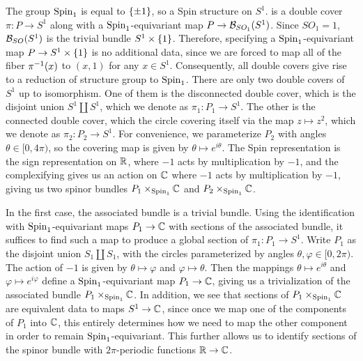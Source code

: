 \begin{exmp}
The group $\mathrm{Spin}_1$ is equal to $\left\lbrace \pm 1 \right\rbrace$, so a Spin structure on $S^1$.
is a double cover $\pi : P \to S^1$ along with a $\mathrm{Spin}_1$-equivariant
map $P \to \mathcal{B}_{SO_1}(S^1)$. Since $SO_1 = 1$, $\mathcal{B}_{SO}(S^1)$ is the trivial
bundle $S^1 \times \left\lbrace 1 \right\rbrace$. Therefore, specifying a $\mathrm{Spin}_1$-equivariant map
$P \to S^1 \times \left\lbrace 1 \right\rbrace$ is no additional data, since we are forced to map
all of the fiber $\pi^{-1}(x)$ to $(x,1)$ for any $x \in S^1$. Consequently,
all double covers give rise to a reduction of structure group to $\mathrm{Spin}_1$.
There are only two double covers of $S^1$ up to isomorphism.
One of them is the disconnected
double cover, which is the disjoint union $S^1 \coprod S^1$, which we denote
as $\pi_1 : P_1 \to S^1$. The other is the connected double cover, which the
circle covering itself via the map $z \mapsto z^2$, which we denote as
$\pi_2 : P_2 \to S^1$. For convenience, we parameterize $P_2$ with angles
$\theta \in [0, 4\pi)$, so the covering map is given by $\theta \mapsto e^{i\theta}$.
The Spin representation is the sign representation on $\mathbb{R}$, where $-1$
acts by multiplication by $-1$, and the complexifying gives us an action on
$\mathbb{C}$ where $-1$ acts by multiplication by $-1$, giving us two spinor bundles
$P_1 \times_{\mathrm{Spin}_1} \mathbb{C}$ and $P_2 \times_{\mathrm{Spin}_1} \mathbb{C}$.

In the first case, the associated bundle is a trivial bundle. Using the identification
with $\mathrm{Spin}_1$-equivariant maps $P_1 \to \mathbb{C}$ with sections of the associated
bundle, it suffices to find such a map to produce a global section of
$\pi_1 : P_1 \to S^1$. Write $P_1$ as the disjoint union $S_1 \coprod S_1$,
with the circles parameterized by angles $\theta,\varphi \in [0,2\pi)$.
The action of $-1$ is given by $\theta \mapsto \varphi$ and
$\varphi \mapsto \theta$. Then the mappings $\theta \mapsto e^{i\theta}$
and $\varphi \mapsto e^{i\varphi}$ define a $\mathrm{Spin}_1$-equivariant map
$P_1 \to \mathbb{C}$, giving us a trivialization of the associated bundle
$P_1 \times_{\mathrm{Spin}_1} \mathbb{C}$. In addition, we see that sections of $P_1\times_{\mathrm{Spin}_1}\mathbb{C}$
are equivalent data to maps $S^1 \to \mathbb{C}$, since once we map one of the components
of $P_1$ into $\mathbb{C}$, this entirely determines how we need to map the other component
in order to remain $\mathrm{Spin}_1$-equivariant. This further allows us to identify
sections of the spinor bundle with $2\pi$-periodic functions $\mathbb{R} \to \mathbb{C}$.


\end{exmp}
